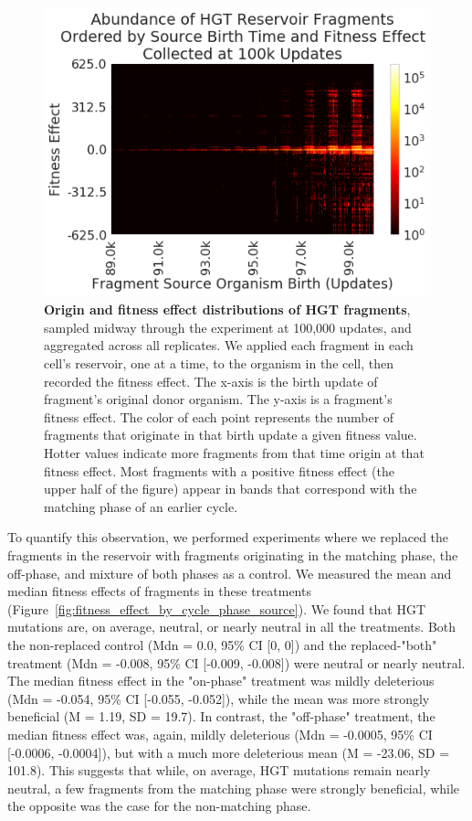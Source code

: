 \documentclass[PhD]{msu-thesis}
\begin{document}
	\begin{figure}[h!]
	\begin{center}
	\includegraphics[width=0.75\columnwidth]{figures/HGT/fitness_effect_heatmap.png}
	\caption{\textbf{Origin and fitness effect distributions of HGT fragments}, sampled midway through the experiment at 100,000 updates, and aggregated across all replicates. We applied each fragment in each cell's reservoir, one at a time, to the organism in the cell, then recorded the fitness effect. The x-axis is the birth update of fragment's original donor organism. The y-axis is a fragment's fitness effect. The color of each point represents the number of fragments that originate in that birth update a given fitness value. Hotter values indicate more fragments from that time origin at that fitness effect. Most fragments with a positive fitness effect (the upper half of the figure) appear in bands that correspond with the matching phase of an earlier cycle. 
	}\label{fig:fitness_effect_heatmap}
	\end{center}
	\end{figure}


To quantify this observation, we performed experiments where we replaced the fragments in the reservoir with fragments originating in the matching phase, the off-phase, and mixture of both phases as a control. We measured the mean and median fitness 
effects of fragments in these treatments (Figure~\ref{fig:fitness_effect_by_cycle_phase_source}). We found that HGT mutations are, on average, neutral, or nearly neutral in all the treatments. Both the non-replaced control (Mdn = 0.0, 95\% CI [0, 0]) and the replaced-"both" treatment (Mdn = -0.008, 95\% CI [-0.009, -0.008]) were neutral or nearly neutral. The median fitness effect in the "on-phase" treatment was mildly deleterious (Mdn = -0.054, 95\% CI [-0.055, -0.052]), while the mean was more strongly beneficial (M = 1.19, SD = 19.7). In contrast, the "off-phase" treatment, the median fitness effect was, again, mildly deleterious (Mdn = -0.0005, 95\% CI [-0.0006, -0.0004]), but with a much more deleterious mean (M = -23.06, SD = 101.8). This suggests that while, on average, HGT mutations remain nearly neutral, a few fragments from the matching phase were strongly beneficial, while the opposite was the case for the non-matching phase.
\end{document}
